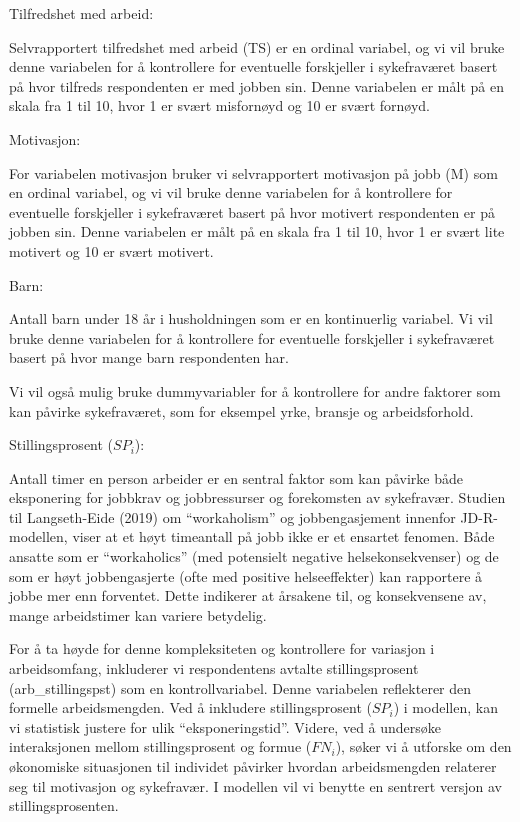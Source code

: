 \documentclass[
  12pt,
  a4paper,
  DIV=11,
  numbers=noendperiod]{scrartcl}
\begin{document}
Tilfredshet med arbeid:

Selvrapportert tilfredshet med arbeid (TS) er en ordinal variabel, og vi
vil bruke denne variabelen for å kontrollere for eventuelle forskjeller
i sykefraværet basert på hvor tilfreds respondenten er med jobben sin.
Denne variabelen er målt på en skala fra 1 til 10, hvor 1 er svært
misfornøyd og 10 er svært fornøyd.

Motivasjon:

For variabelen motivasjon bruker vi selvrapportert motivasjon på jobb
(M) som en ordinal variabel, og vi vil bruke denne variabelen for å
kontrollere for eventuelle forskjeller i sykefraværet basert på hvor
motivert respondenten er på jobben sin. Denne variabelen er målt på en
skala fra 1 til 10, hvor 1 er svært lite motivert og 10 er svært
motivert.

Barn:

Antall barn under 18 år i husholdningen som er en kontinuerlig variabel.
Vi vil bruke denne variabelen for å kontrollere for eventuelle
forskjeller i sykefraværet basert på hvor mange barn respondenten har.

Vi vil også mulig bruke dummyvariabler for å kontrollere for andre
faktorer som kan påvirke sykefraværet, som for eksempel yrke, bransje og
arbeidsforhold.

Stillingsprosent (\(SP_i\)):

Antall timer en person arbeider er en sentral faktor som kan påvirke
både eksponering for jobbkrav og jobbressurser og forekomsten av
sykefravær. Studien til Langseth-Eide (2019) om ``workaholism'' og
jobbengasjement innenfor JD-R-modellen, viser at et høyt timeantall på
jobb ikke er et ensartet fenomen. Både ansatte som er ``workaholics''
(med potensielt negative helsekonsekvenser) og de som er høyt
jobbengasjerte (ofte med positive helseeffekter) kan rapportere å jobbe
mer enn forventet. Dette indikerer at årsakene til, og konsekvensene av,
mange arbeidstimer kan variere betydelig.

For å ta høyde for denne kompleksiteten og kontrollere for variasjon i
arbeidsomfang, inkluderer vi respondentens avtalte stillingsprosent
(arb\_stillingspst) som en kontrollvariabel. Denne variabelen
reflekterer den formelle arbeidsmengden. Ved å inkludere
stillingsprosent (\(SP_i\)) i modellen, kan vi statistisk justere for
ulik ``eksponeringstid''. Videre, ved å undersøke interaksjonen mellom
stillingsprosent og formue (\(FN_i\)), søker vi å utforske om den
økonomiske situasjonen til individet påvirker hvordan arbeidsmengden
relaterer seg til motivasjon og sykefravær. I modellen vil vi benytte en
sentrert versjon av stillingsprosenten.
\end{document}
